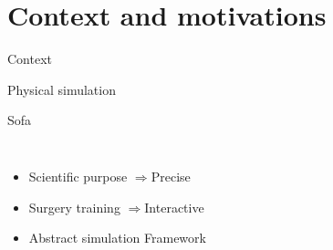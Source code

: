 \documentclass[xcolor={usenames,dvipsnames}]{beamer}
\newcommand{\sectiontitle}{}
\newcommand{\newsection}[1]{\renewcommand{\sectiontitle}{#1}\section{#1}}
\begin{document}
\newsection{Context and motivations}
\begin{frame}{Context}
    \begin{block}{Physical simulation}
        \hfill
        \parbox[c][.26\textheight][t]{.98\textwidth}{
        }
    \end{block}
    \pause
    \pause
    \pause
    \pause
    \begin{alertblock}{Sofa \cite{Allard07SOFA,Nesme09Preserving,Faure11Sparse}}
        \begin{columns}
            \begin{itemize}[<+->]
                \item Scientific purpose $\Rightarrow$\alert{Precise}
                \item Surgery training $\Rightarrow$\alert{Interactive} 
                \item \alert{Abstract} simulation Framework

\end{itemize}
\end{columns}
\end{alertblock}
\end{frame}
\end{document}
